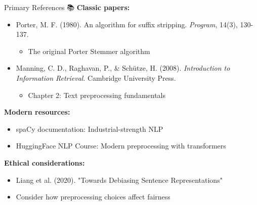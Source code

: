 \documentclass[aspectratio=169]{beamer}
\begin{document}
\begin{frame}[shrink=10]{Primary References 📚}
    \textbf{Classic papers:}
    \begin{itemize}\setlength{\itemsep}{0pt}
        \item Porter, M. F. (1980). An algorithm for suffix stripping. \textit{Program}, 14(3), 130-137.
        \begin{itemize}\setlength{\itemsep}{0pt}
            \item The original Porter Stemmer algorithm
        \end{itemize}

        \item Manning, C. D., Raghavan, P., \& Schütze, H. (2008). \textit{Introduction to Information Retrieval}. Cambridge University Press.
        \begin{itemize}\setlength{\itemsep}{0pt}
            \item Chapter 2: Text preprocessing fundamentals
        \end{itemize}
    \end{itemize}

    \vspace{0.5em}
    \textbf{Modern resources:}
    \begin{itemize}\setlength{\itemsep}{0pt}
        \item spaCy documentation: Industrial-strength NLP
        \item HuggingFace NLP Course: Modern preprocessing with transformers
    \end{itemize}

    \vspace{0.5em}
    \textbf{Ethical considerations:}
    \begin{itemize}\setlength{\itemsep}{0pt}
        \item Liang et al. (2020). "Towards Debiasing Sentence Representations"
        \item Consider how preprocessing choices affect fairness
    \end{itemize}
\end{frame}
\end{document}
